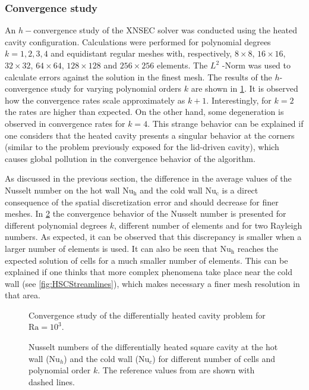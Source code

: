 

\subsubsection{Convergence study}\label{ssec:ConvStudyHeatedCavity}
An $h-$convergence study of the XNSEC solver was conducted using the heated cavity configuration. Calculations were performed for polynomial degrees $k = {1,2,3,4}$ and equidistant regular meshes with, respectively, $8\times8$, $16\times16$, $32\times32$, $64\times64$, $128\times128$ and $256\times256$ elements.  The $L^2$ -Norm was used to calculate errors against the solution in the finest mesh. The results of the $h$-convergence study for varying polynomial orders $k$ are shown in \cref{fig:ConvergenceDHC}. It is observed how the convergence rates scale approximately as $k+1$. Interestingly, for $k=2$ the rates are higher than expected. On the other hand, some degeneration is observed in convergence rates for $k = 4$. This strange behavior can be explained if one considers that the heated cavity presents a singular behavior at the corners (similar to the problem previously exposed for the lid-driven cavity), which causes global pollution in the convergence behavior of the algorithm. 
 
As discussed in the previous section, the difference in the average values of the Nusselt number on the hot wall $\text{Nu}_\text{h}$  and the cold wall $\text{Nu}_\text{c}$ is a direct consequence of the spatial discretization error and should decrease for finer meshes. In \cref{fig:NusseltStudy} the convergence behavior of the Nusselt number is presented for different polynomial degrees $k$, different number of elements and for two Rayleigh numbers. As expected, it can be observed that this discrepancy is smaller when a larger number of elements is used. It can also be seen that  $\text{Nu}_\text{h}$ reaches the expected solution of cells for a much smaller number of elements. This can be explained if one thinks that more complex phenomena take place near the cold wall (see \cref{fig:HSCStreamlines}), which makes necessary a finer mesh resolution in that area.



\begin{figure}[tb]
	\centering
	\pgfplotsset{width=0.34\textwidth, compat=1.3}
	\caption{Convergence study of the differentially heated cavity problem for $\text{Ra} = 10^3$.}\label{fig:ConvergenceDHC}
\end{figure}
\begin{figure}[tb]
	\centering
	\caption[Nusselt numbers of the differentially heated square cavity at the hot wall ($\text{Nu}_h$) and the cold wall ($\text{Nu}_c$) for different number of cells and polynomial order $k$.]{Nusselt numbers of the differentially heated square cavity at the hot wall ($\text{Nu}_h$) and the cold wall ($\text{Nu}_c$) for different number of cells and polynomial order $k$. The reference values from \textcite{vierendeelsBenchmarkSolutionsNatural2003} are shown with dashed lines.}\label{fig:NusseltStudy}
\end{figure}
\FloatBarrier
